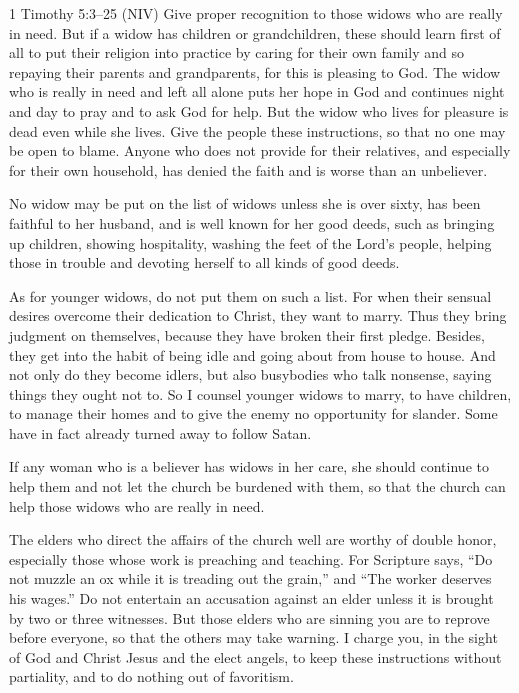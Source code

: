 \documentclass{beamer}
\begin{document}
\begin{frame}{1 Timothy 5:3--25 (NIV)}
    Give proper recognition to those widows who are really in need. 
    But if a widow has children or grandchildren, these should learn first of all
    to put their religion into practice by caring for their own family and so
    repaying their parents and grandparents, for this is pleasing to God. 
    The widow who is really in need and left all alone puts her hope in God and
    continues night and day to pray and to ask God for help. 
    But the widow who lives for pleasure is dead even while she lives. 
    Give the people these instructions, so that no one may be open to blame. 
    Anyone who does not provide for their relatives, and especially for their own
    household, has denied the faith and is worse than an unbeliever.
\end{frame}

\begin{frame}
    No widow may be put on the list of widows unless she is over sixty, has been
    faithful to her husband, and is well known for her good deeds, such as bringing
    up children, showing hospitality, washing the feet of the Lord’s people,
    helping those in trouble and devoting herself to all kinds of good deeds.

    As for younger widows, do not put them on such a list. 
    For when their sensual desires overcome their dedication to Christ, they want
    to marry. 
    Thus they bring judgment on themselves, because they have broken their first
    pledge.
    Besides, they get into the habit of being idle and going about from house to
    house. 
    And not only do they become idlers, but also busybodies who talk nonsense,
    saying things they ought not to. 
    So I counsel younger widows to marry, to have children, to manage their homes
    and to give the enemy no opportunity for slander. 
    Some have in fact already turned away to follow Satan.

    If any woman who is a believer has widows in her care, she should continue to
    help them and not let the church be burdened with them, so that the church can
    help those widows who are really in need.
\end{frame}

\begin{frame}
    The elders who direct the affairs of the church well are worthy of double
    honor, especially those whose work is preaching and teaching. 
    For Scripture says, ``Do not muzzle an ox while it is treading out the grain,''
    and ``The worker deserves his wages.'' 
    Do not entertain an accusation against an elder unless it is brought by two or
    three witnesses. 
    But those elders who are sinning you are to reprove before everyone, so that
    the others may take warning. 
    I charge you, in the sight of God and Christ Jesus and the elect angels, to
    keep these instructions without partiality, and to do nothing out of
    favoritism.
\end{frame}
\end{document}

